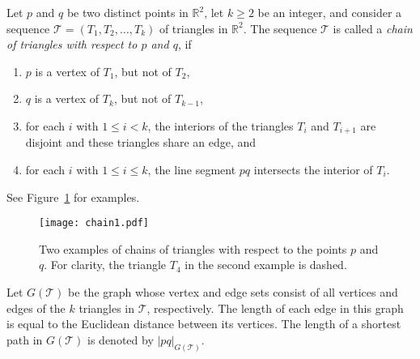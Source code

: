 \documentclass[12pt]{article}
\newcommand{\IR}{\mathbb{R}}
\begin{document}
Let $p$ and $q$ be two distinct points in $\IR^2$, let $k \geq 2$ be 
an integer, and consider a sequence 
$\mathcal{T} = (T_1,T_2,\ldots,T_k)$ of triangles in $\IR^2$. The 
sequence $\mathcal{T}$ is called a 
\emph{chain of triangles with respect to $p$ and $q$}, if 
\begin{enumerate} 
\item $p$ is a vertex of $T_1$, but not of $T_2$,  
\item $q$ is a vertex of $T_k$, but not of $T_{k-1}$,  
\item for each $i$ with $1 \leq i < k$, the interiors of the triangles 
      $T_i$ and $T_{i+1}$ are disjoint and these triangles share an edge,
      and 
\item for each $i$ with $1 \leq i \leq k$, the line segment $pq$ 
      intersects the interior of $T_i$. 
\end{enumerate} 
See Figure~\ref{figchain} for examples. 

\begin{figure}
\begin{center}
\texttt{[image: chain1.pdf]}
\end{center}
\caption{Two examples of chains of triangles with respect to the points 
         $p$ and $q$. For clarity, the triangle $T_4$ in the second 
         example is dashed.} 
\label{figchain}
\end{figure}

Let $G(\mathcal{T})$ be the graph whose vertex and edge sets consist of 
all vertices and edges of the $k$ triangles in $\mathcal{T}$, 
respectively. The length of each edge in this graph is equal to the 
Euclidean distance between its vertices. The length of a shortest path 
in $G(\mathcal{T})$ is denoted by $|pq|_{G(\mathcal{T})}$. 
\end{document}
